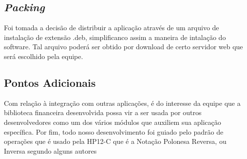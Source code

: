 \subsection{\textit{Packing}}
Foi tomada a decisão de distribuir a aplicação através de um arquivo de instalação de extensão .deb, simplificanco assim a maneira de intalação do software. Tal arquivo poderá ser obtido por download de certo servidor web que será escolhido pela equipe.

\subsection{Pontos Adicionais}
Com relação à integração com outras aplicações, é do interesse da equipe que a biblioteca financeira desenvolvida possa vir a ser usada por outros desenvolvedores como um dos vários módulos que auxiliem sua aplicação específica.
Por fim, todo nosso desenvolvimento foi guiado pelo padrão de operações que é usado pela HP12-C que é a Notação Polonesa Reversa, ou Inversa segundo alguns autores \cite{NPR}





